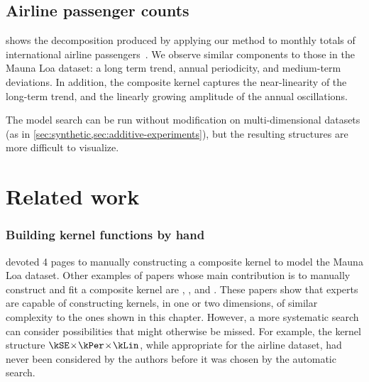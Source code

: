 \subsection{Airline passenger counts}

 shows the decomposition produced by applying our method to monthly totals of international airline passengers~\citep{box2013time}.
We observe similar components to those in the Mauna Loa dataset: a long term trend, annual periodicity, and medium-term deviations.
In addition, the composite kernel captures the near-linearity of the long-term trend, and the linearly growing amplitude of the annual oscillations.



The model search can be run without modification on multi-dimensional datasets (as in \cref{sec:synthetic,sec:additive-experiments}), but the resulting structures are more difficult to visualize.


\section{Related work}
\label{sec:gpss-related-work}

\def\rwsheader{\subsubsection}

\rwsheader{Building kernel functions by hand}
\citet[chapter 5]{rasmussen38gaussian} devoted 4 pages to manually constructing a composite kernel to model the Mauna Loa dataset.
Other examples of papers whose main contribution is to manually construct and fit a composite \gp{} kernel are \citet{textperiodic13}, \citet{lloydgefcom2012}, and \citet{EdgarTelescope}.
These papers show that experts are capable of constructing kernels, in one or two dimensions, of similar complexity to the ones shown in this chapter.
However, a more systematic search can consider possibilities that might otherwise be missed.
For example, the kernel structure $\kSE \kerntimes \kPer \kerntimes \kLin$, while appropriate for the airline dataset, had never been considered by the authors before it was chosen by the automatic search.



